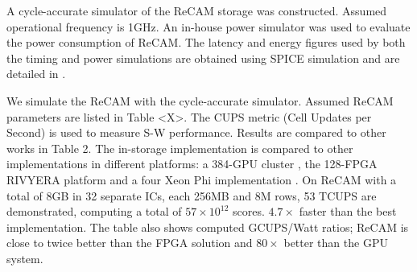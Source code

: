 \documentclass{superfri}
\begin{document}

A cycle-accurate simulator of the ReCAM storage was constructed. Assumed operational frequency is 1GHz. An in-house power simulator was used to evaluate the power consumption of ReCAM. The latency and energy figures used by both the timing and power simulations are obtained using SPICE simulation and are detailed in \cite{yavits2015resistive}. 

We simulate the ReCAM with the cycle-accurate simulator. Assumed ReCAM parameters are listed in Table <X>. The CUPS metric (Cell Updates per Second) is used to measure S-W performance. Results are compared to other works in Table 2. The in-storage implementation is compared to other implementations in different platforms: a 384-GPU cluster \cite{de2016cudalign}, the 128-FPGA RIVYERA platform \cite{wienbrandt2014fpga} and a four Xeon Phi implementation \cite{liu2014swaphi}. On ReCAM with a total of 8GB in 32 separate ICs, each 256MB and 8M rows, 53 TCUPS are demonstrated, computing a total of $57\times10^{12}$ scores. $4.7\times$ faster than the best implementation. The table also shows computed GCUPS/Watt ratios; ReCAM is close to twice better than the FPGA solution and $80\times$ better than the GPU system.



\end{document}
